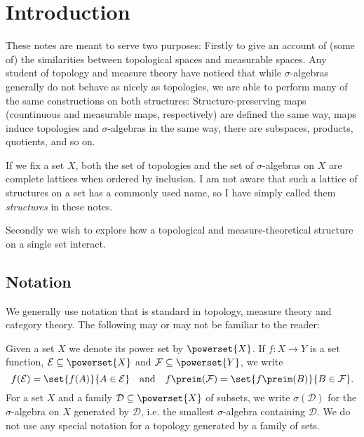 \documentclass[article, a4paper, 11pt, oneside]{memoir}
\title{\doctitle}
\author{\docauthor}
\numberwithin{equation}{chapter}
\newcommand{\calE}{\mathcal{E}}
\newcommand{\calD}{\mathcal{D}}
\newcommand{\calF}{\mathcal{F}}
\begin{document}
\maketitle

\chapter{Introduction}

These notes are meant to serve two purposes: Firstly to give an account of (some of) the similarities between topological spaces and measurable spaces. Any student of topology and measure theory have noticed that while $\sigma$-algebras generally do not behave as nicely as topologies, we are able to perform many of the same constructions on both structures: Structure-preserving maps (countinuous and measurable maps, respectively) are defined the same way, maps induce topologies and $\sigma$-algebras in the same way, there are subspaces, products, quotients, and so on.

If we fix a set $X$, both the set of topologies and the set of $\sigma$-algebras on $X$ are complete lattices when ordered by inclusion. I am not aware that such a lattice of structures on a set has a commonly used name, so I have simply called them \emph{structures} in these notes.

Secondly we wish to explore how a topological and measure-theoretical structure on a single set interact.


\section{Notation}

We generally use notation that is standard in topology, measure theory and category theory. The following may or may not be familiar to the reader:

Given a set $X$ we denote its power set by $\powerset{X}$. If $f \colon X \to Y$ is a set function, $\calE \subseteq \powerset{X}$ and $\calF \subseteq \powerset{Y}$, we write
%
\begin{equation*}
    f(\calE)
        = \set{f(A)}{A \in \calE}
    \quad \text{and} \quad
    f\preim(\calF)
        = \set{f\preim(B)}{B \in \calF}.
\end{equation*}
%
For a set $X$ and a family $\calD \subseteq \powerset{X}$ of subsets, we write $\sigma(\calD)$ for the $\sigma$-algebra on $X$ generated by $\calD$, i.e. the smallest $\sigma$-algebra containing $\calD$. We do not use any special notation for a topology generated by a family of sets.
\end{document}
